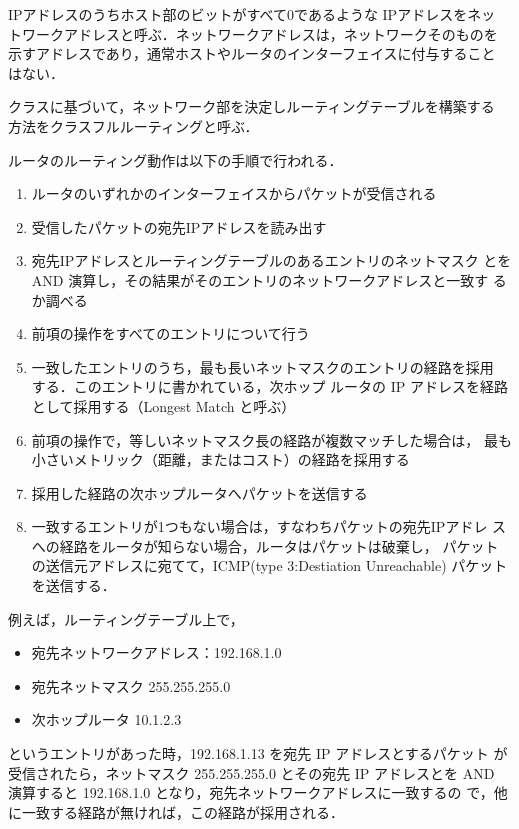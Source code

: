 IPアドレスのうちホスト部のビットがすべて0であるような IPアドレスをネッ
トワークアドレスと呼ぶ．ネットワークアドレスは，ネットワークそのものを
示すアドレスであり，通常ホストやルータのインターフェイスに付与すること
はない．

クラスに基づいて，ネットワーク部を決定しルーティングテーブルを構築する
方法をクラスフルルーティングと呼ぶ．

ルータのルーティング動作は以下の手順で行われる．

\begin{enumerate}
\item ルータのいずれかのインターフェイスからパケットが受信される
\item 受信したパケットの宛先IPアドレスを読み出す
\item 宛先IPアドレスとルーティングテーブルのあるエントリのネットマスク
  とを AND 演算し，その結果がそのエントリのネットワークアドレスと一致す
  るか調べる
\item 前項の操作をすべてのエントリについて行う
\item 一致したエントリのうち，最も長いネットマスクのエントリの経路を採用
      する．このエントリに書かれている，次ホップ
      ルータの IP アドレスを経路として採用する（Longest Match と呼ぶ）
\item 前項の操作で，等しいネットマスク長の経路が複数マッチした場合は，
  最も小さいメトリック（距離，またはコスト）の経路を採用する
\item 採用した経路の次ホップルータへパケットを送信する
\item 一致するエントリが1つもない場合は，すなわちパケットの宛先IPアドレ
      スへの経路をルータが知らない場合，ルータはパケットは破棄し，
      パケットの送信元アドレスに宛てて，ICMP(type 3:Destiation
      Unreachable) パケットを送信する．
\end{enumerate}

例えば，ルーティングテーブル上で，
\begin{itemize}
\item 宛先ネットワークアドレス：192.168.1.0
\item 宛先ネットマスク 255.255.255.0
\item 次ホップルータ 10.1.2.3
\end{itemize}
というエントリがあった時，192.168.1.13 を宛先 IP アドレスとするパケット
が受信されたら，ネットマスク 255.255.255.0 とその宛先 IP アドレスとを
AND 演算すると 192.168.1.0 となり，宛先ネットワークアドレスに一致するの
で，他に一致する経路が無ければ，この経路が採用される．

